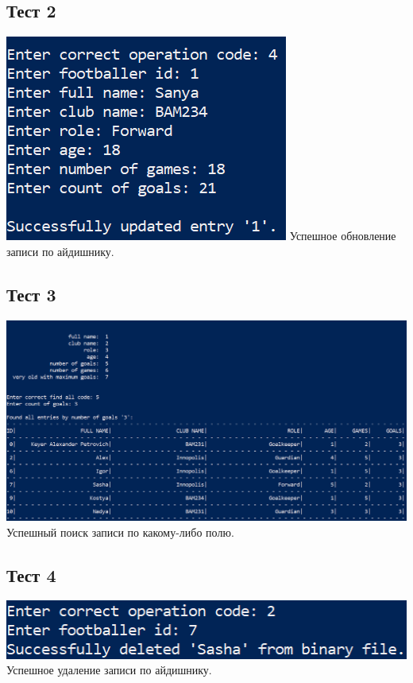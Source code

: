 \documentclass[12pt]{article}
\begin{document}
	\subsection{Тест 2}
	\includegraphics[width=1\linewidth]{test_2.png} \newline
	Успешное обновление записи по айдишнику.
	
	\subsection{Тест 3}
	\includegraphics[width=1\linewidth]{test_3.png} \newline
	Успешный поиск записи по какому-либо полю.
	
	\subsection{Тест 4}
	\includegraphics[width=1\linewidth]{test_4.png} \newline
	Успешное удаление записи по айдишнику.
	
\end{document}
